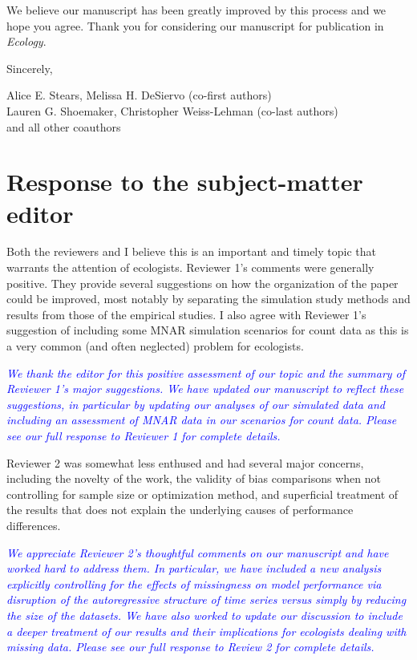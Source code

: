 \documentclass{article}
\begin{document}
\begin{linenumbers}
\noindent We believe our manuscript has been greatly improved by this process and we hope you agree. Thank you for considering our manuscript for publication in \textit{Ecology}.

\bigskip

\noindent Sincerely, 

\noindent Alice E. Stears,  Melissa H. DeSiervo (co-first authors) \\
Lauren G. Shoemaker, Christopher Weiss-Lehman (co-last authors) \\
and all other coauthors


\clearpage


\section{Response to the subject-matter editor}
Both the reviewers and I believe this is an important and timely topic that warrants the attention of ecologists. Reviewer 1’s comments were generally positive. They provide several suggestions on how the organization of the paper could be improved, most notably by separating the simulation study methods and results from those of the empirical studies. I also agree with Reviewer 1’s suggestion of including some MNAR simulation scenarios for count data as this is a very common (and often neglected) problem for ecologists.

\noindent \textcolor{blue}{\textit{We thank the editor for this positive assessment of our topic and the summary of Reviewer 1's major suggestions. We have updated our manuscript to reflect these suggestions, in particular by updating our analyses of our simulated data and including an assessment of MNAR data in our scenarios for count data. Please see our full response to Reviewer 1 for complete details.}}

\bigskip

\noindent Reviewer 2 was somewhat less enthused and had several major concerns, including the novelty of the work, the validity of bias comparisons when not controlling for sample size or optimization method, and superficial treatment of the results that does not explain the underlying causes of performance differences.

\noindent \textcolor{blue}{\textit{We appreciate Reviewer 2's thoughtful comments on our manuscript and have worked hard to address them. In particular, we have included a new analysis explicitly controlling for the effects of missingness on model performance via disruption of the autoregressive structure of time series versus simply by reducing the size of the datasets. We have also worked to update our discussion to include a deeper treatment of our results and their implications for ecologists dealing with missing data. Please see our full response to Review 2 for complete details.}}


\end{linenumbers}
\end{document}
